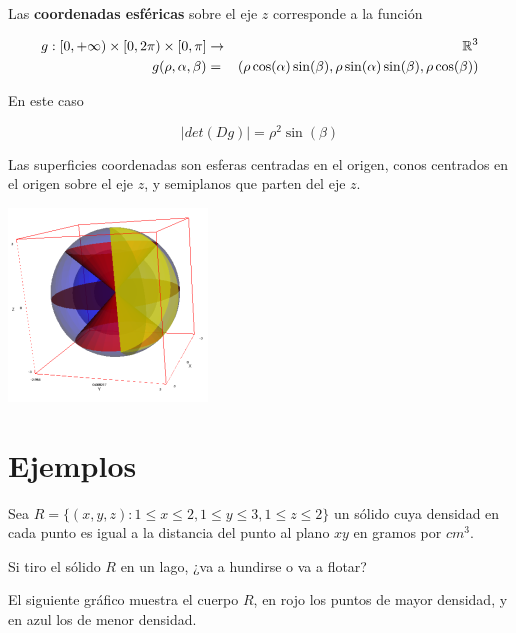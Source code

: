 \begin{definition}[Esféricas] 
Las \textbf{coordenadas esféricas} sobre el eje $z$ corresponde a la función

\begin{eqnarray*} g : [0, +\infty) \times [0, 2\pi) \times [0, \pi] &\to& \mathbb{R}^3 \\
g(\rho, \alpha, \beta) &=& ( \rho \cos(\alpha) \sin(\beta), \rho \sin(\alpha) \sin(\beta), \rho \cos(\beta) ) \end{eqnarray*}

En este caso

$$ |det(Dg)| = \rho^2 \sin(\beta) $$

Las superficies coordenadas son esferas centradas en el origen, conos centrados en el origen sobre el eje $z$, y semiplanos que parten del eje $z$.

\begin{center}
\includegraphics{images/04_analisis2/coord_esfer.png}
\end{center}
\end{definition}

\section{Ejemplos}

\begin{example}
Sea $R = \{(x,y,z) : 1 \leq x \leq 2, 1 \leq y \leq 3, 1 \leq z \leq 2 \}$ un sólido cuya densidad en cada punto es igual a la distancia del punto al plano $xy$ en gramos por $cm^3$.

Si tiro el sólido $R$ en un lago, ¿va a hundirse o va a flotar?
\end{example}

El siguiente gráfico muestra el cuerpo $R$, en rojo los puntos de mayor densidad, y en azul los de menor densidad.

